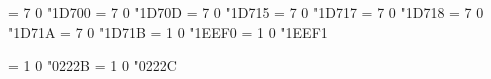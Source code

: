 \let\mitvarTheta=\varTheta
\Umathchardef\varepsilon = 7 0 "1D700 %
\let\mitvarepsilon=\varepsilon
\Umathchardef\varsigma = 7 0 "1D70D %
\let\mitvarsigma=\varsigma
\Umathchardef\varphi = 7 0 "1D715 %
\let\mitvarphi=\varphi
\Umathchardef\vartheta = 7 0 "1D717 %
\let\mitvartheta=\vartheta
\Umathchardef\varkappa = 7 0 "1D718 %
\let\mitvarkappa=\varkappa
\Umathchardef\varrho = 7 0 "1D71A %
\let\mitvarrho=\varrho
\Umathchardef\varpi = 7 0 "1D71B %
\let\mitvarpi=\varpi
\Umathchardef\arabicmaj = 1 0 "1EEF0 %
\Umathchardef\arabichad = 1 0 "1EEF1 %

\let\{=\lbrace
\let\}=\rbrace
\let\|=\Vert

\Umathchardef\intop = 1 0 "0222B
\def\int{\intop\nolimits}
\Umathchardef\iintop = 1 0 "0222C
\def\iint{\iintop\nolimits}


